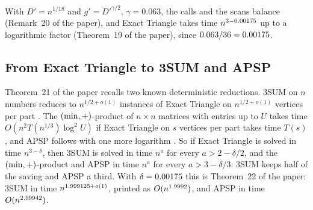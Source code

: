 With \(D'=n^{1/18}\) and \(g'=D'^{\gamma/2}\), \(\gamma=0.063\), the calls and
the scans balance (Remark~20 of the paper), and Exact Triangle takes time
\(n^{3-0.00175}\) up to a logarithmic factor (Theorem~19 of the paper), since
\(0.063/36=0.00175\).

\subsection{From Exact Triangle to 3SUM and APSP}
\label{sec:known}

Theorem~21 of the paper recalls two known deterministic reductions.  3SUM on
\(n\) numbers reduces to \(n^{1/2+o(1)}\) instances of Exact Triangle on
\(n^{1/2+o(1)}\) vertices per part \cite{CH20,VW13}.  The \((\min,+)\)-product
of \(n\times n\) matrices with entries up to \(U\) takes time
\(O(n^{2}T(n^{1/3})\log^{2}U)\) if Exact Triangle on \(s\) vertices per part
takes time \(T(s)\), and APSP follows with one more logarithm
\cite{VW10,VW18,VW13}.  So if Exact Triangle is solved in time \(n^{3-\delta}\),
then 3SUM is solved in time \(n^{a}\) for every \(a>2-\delta/2\), and the
\((\min,+)\)-product and APSP in time \(n^{a}\) for every \(a>3-\delta/3\):
3SUM keeps half of the saving and APSP a third.  With \(\delta=0.00175\) this
is Theorem~22 of the paper: 3SUM in time \(n^{1.999125+o(1)}\), printed
as \(O(n^{1.9992})\), and APSP in time \(O(n^{2.99942})\).
